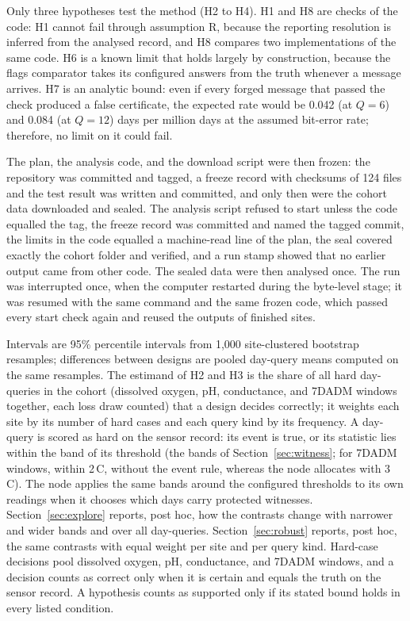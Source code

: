 Only three hypotheses test the method (H2 to H4). H1 and H8 are checks of the code: H1 cannot fail through assumption R, because the reporting resolution is inferred from the analysed record, and H8 compares two implementations of the same code. H6 is a known limit that holds largely by construction, because the flags comparator takes its configured answers from the truth whenever a message arrives. H7 is an analytic bound: even if every forged message that passed the check produced a false certificate, the expected rate would be 0.042 (at $Q = 6$) and 0.084 (at $Q = 12$) days per million days at the assumed bit-error rate; therefore, no limit on it could fail.

The plan, the analysis code, and the download script were then frozen: the repository was committed and tagged, a freeze record with checksums of 124 files and the test result was written and committed, and only then were the cohort data downloaded and sealed. The analysis script refused to start unless the code equalled the tag, the freeze record was committed and named the tagged commit, the limits in the code equalled a machine-read line of the plan, the seal covered exactly the cohort folder and verified, and a run stamp showed that no earlier output came from other code. The sealed data were then analysed once. The run was interrupted once, when the computer restarted during the byte-level stage; it was resumed with the same command and the same frozen code, which passed every start check again and reused the outputs of finished sites.

Intervals are 95\% percentile intervals from 1,000 site-clustered bootstrap resamples; differences between designs are pooled day-query means computed on the same resamples. The estimand of H2 and H3 is the share of all hard day-queries in the cohort (dissolved oxygen, pH, conductance, and 7DADM windows together, each loss draw counted) that a design decides correctly; it weights each site by its number of hard cases and each query kind by its frequency. A day-query is scored as hard on the sensor record: its event is true, or its statistic lies within the band of its threshold (the bands of Section~\ref{sec:witness}; for 7DADM windows, within 2\,\textdegree C, without the event rule, whereas the node allocates with 3\,\textdegree C). The node applies the same bands around the configured thresholds to its own readings when it chooses which days carry protected witnesses. Section~\ref{sec:explore} reports, post hoc, how the contrasts change with narrower and wider bands and over all day-queries. Section~\ref{sec:robust} reports, post hoc, the same contrasts with equal weight per site and per query kind. Hard-case decisions pool dissolved oxygen, pH, conductance, and 7DADM windows, and a decision counts as correct only when it is certain and equals the truth on the sensor record. A hypothesis counts as supported only if its stated bound holds in every listed condition.

